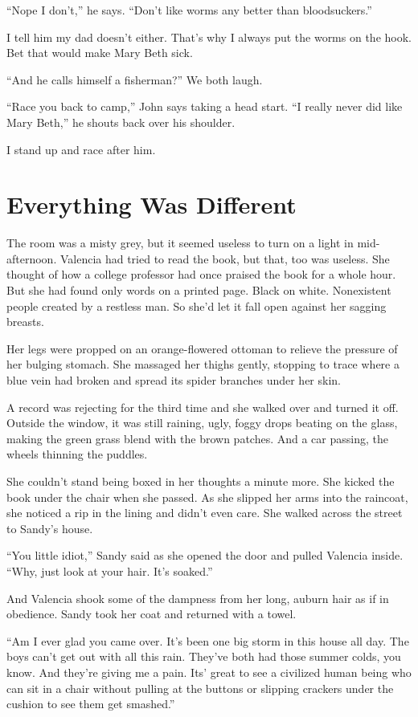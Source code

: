 \documentclass[twoside,10pt]{book}
\begin{document}
``Nope I don't,'' he says. ``Don't like worms any better than
bloodsuckers.''

I tell him my dad doesn't either. That's why I always put the worms on
the hook. Bet that would make Mary Beth sick.

``And he calls himself a fisherman?'' We both laugh.

``Race you back to camp,'' John says taking a head start. ``I really
never did like Mary Beth,'' he shouts back over his shoulder.

I stand up and race after him.



\cleardoublepage
\chapter{Everything Was Different}

The room was a misty grey, but it seemed useless to turn on a light in
mid-afternoon. Valencia had tried to read the book, but that, too was
useless. She thought of how a college professor had once praised the
book for a whole hour. But she had found only words on a printed page.
Black on white. Nonexistent people created by a restless man. So she'd
let it fall open against her sagging breasts.

Her legs were propped on an orange-flowered ottoman to relieve the
pressure of her bulging stomach. She massaged her thighs gently,
stopping to trace where a blue vein had broken and spread its spider
branches under her skin.

A record was rejecting for the third time and she walked over and turned
it off. Outside the window, it was still raining, ugly, foggy drops
beating on the glass, making the green grass blend with the brown
patches. And a car passing, the wheels thinning the puddles.

She couldn't stand being boxed in her thoughts a minute more. She kicked
the book under the chair when she passed. As she slipped her arms into
the raincoat, she noticed a rip in the lining and didn't even care. She
walked across the street to Sandy's house.

``You little idiot,'' Sandy said as she opened the door and pulled
Valencia inside. ``Why, just look at your hair. It's soaked.''

And Valencia shook some of the dampness from her long, auburn hair as if
in obedience. Sandy took her coat and returned with a towel.

``Am I ever glad you came over. It's been one big storm in this house
all day. The boys can't get out with all this rain. They've both had
those summer colds, you know. And they're giving me a pain. Its' great
to see a civilized human being who can sit in a chair without pulling at
the buttons or slipping crackers under the cushion to see them get
smashed.''
\end{document}
